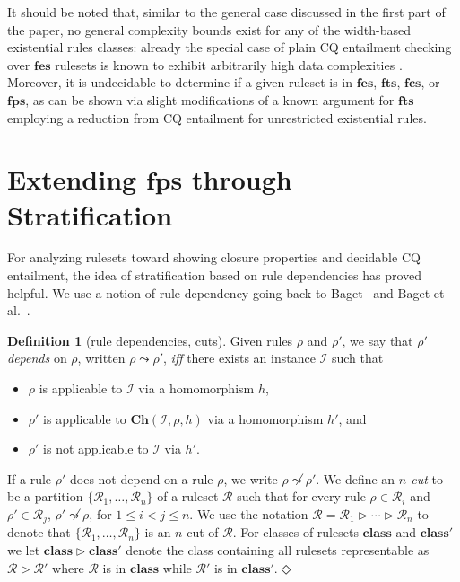 \documentclass[10pt,a4paper]{amsart}
\theoremstyle{definition}
\numberwithin{equation}{section}
\theoremstyle{plain}
\theoremstyle{definition}
\newtheorem{definition}[definition]{Definition}
\newcommand{\remarkstart}{\color{black}}
\theoremstyle{myexample}
\theoremstyle{plain}
\theoremstyle{definition}
\newcommand{\instance}{\mathcal{I}}
\newcommand{\triggers}[2]{#1 \leadsto #2}
\newcommand{\ntriggers}[2]{#1 \not\leadsto #2}
\newcommand{\cut}{\triangleright}
\newcommand{\ruleset}{\calr}
\newcommand{\bts}{\mathbf{fts}}
\newcommand{\fes}{\mathbf{fes}}
\newcommand{\fcs}{\mathbf{fcs}}
\newcommand{\fps}{\mathbf{fps}} %
\newcommand{\hcs}{\fps}
\newcommand{\fhcs}{\hcs}
\newcommand{\chase}{\mathbf{Ch}}
\newcommand{\calr}{\mathcal{R}}
\newcommand{\iffi}{\textit{iff} } %
\newcommand{\defend}{\hfill\ensuremath{\Diamond}}
\begin{document}
It should be noted that, similar to the general case discussed in the first part of the paper, no general complexity bounds exist for any of the width-based existential rules classes: already the special case of plain CQ entailment checking over $\fes$ rulesets is known to exhibit arbitrarily high data complexities \cite{BourgauxCKRT21}. 
%
Moreover, it is undecidable to determine if a given ruleset is in $\fes$, $\bts$, $\fcs$, or $\fhcs$, as can be shown via slight modifications of a known argument for $\bts$  \cite{BagLecMugSal11} \remarkstart employing a reduction from CQ entailment for unrestricted existential rules\color{black}.  


\section{Extending $\fhcs$ through Stratification}\label{sec:strat}

For analyzing rulesets toward showing closure properties and decidable CQ entailment, the idea of stratification based on rule dependencies has proved helpful. 
We use a notion of rule dependency going back to Baget~\cite{Bag04} and Baget et al.~\cite{BagLecMugSal11}.   

\begin{definition}[rule dependencies, cuts] Given rules $\rho$ and $\rho'$, we say that $\rho'$ \emph{depends} on $\rho$, written $\triggers{\rho}{\rho'}$, \iffi there exists an instance $\instance$ such that 
\begin{itemize}
    \item $\rho$ is applicable to $\instance$ via a homomorphism $h$, 
    \item $\rho'$ is applicable to $\chase(\instance,\rho,h)$ via a homomorphism $h'$, and
    \item $\rho'$ is not applicable to $\instance$ via $h'$.
\end{itemize}
If a rule $\rho'$ does not depend on a rule $\rho$, we write $\ntriggers{\rho}{\rho'}$. We define an \emph{$n$-cut} to be a partition $\{\ruleset_{1}, \ldots, \ruleset_{n}\}$ of a ruleset $\ruleset$ such that for every rule $\rho \in \ruleset_{i}$ and $\rho' \in \ruleset_{j}$, $\ntriggers{\rho'}{\rho}$, for $1 \leq i < j \leq n$. We use the notation $\ruleset = \ruleset_{1} \cut \cdots \cut \ruleset_{n}$ to denote that $\{\ruleset_{1}, \ldots, \ruleset_{n}\}$ is an $n$-cut of $\ruleset$.
\remarkstart For classes of rulesets $\mathbf{class}$ and $\mathbf{class}'$  we let $\mathbf{class} \cut \mathbf{class}'$ denote the class containing all rulesets representable as $\ruleset \cut \ruleset'$ where $\ruleset$ is in $\mathbf{class}$ while  $\ruleset'$ is in $\mathbf{class}'$.\color{black}\defend
\end{definition}
\end{document}
